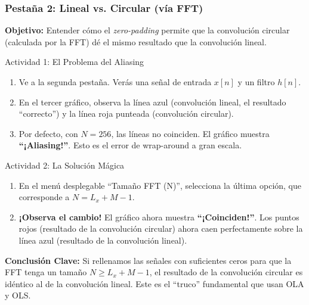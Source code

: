 \documentclass[10pt]{beamer}
\begin{document}
\begin{frame}[allowframebreaks]
  \frametitle{Pestaña 2: Lineal vs. Circular (vía FFT)}
  
  \textbf{Objetivo:} Entender cómo el \textit{zero-padding} permite que la convolución circular (calculada por la FFT) dé el mismo resultado que la convolución lineal.
  
  \begin{block}{Actividad 1: El Problema del Aliasing}
    \begin{enumerate}
      \item Ve a la segunda pestaña. Verás una señal de entrada $x[n]$ y un filtro $h[n]$.
      \item En el tercer gráfico, observa la línea azul (convolución lineal, el resultado ``correcto'') y la línea roja punteada (convolución circular).
      \item Por defecto, con $N=256$, las líneas no coinciden. El gráfico muestra \textbf{“¡Aliasing!”}. Esto es el error de wrap-around a gran escala.
    \end{enumerate}
  \end{block}
  
  \pause
  
  \begin{block}{Actividad 2: La Solución Mágica}
    \begin{enumerate}
      \item En el menú desplegable “Tamaño FFT (N)”, selecciona la última opción, que corresponde a $N = L_x + M - 1$.
      \item \textbf{¡Observa el cambio!} El gráfico ahora muestra \textbf{“¡Coinciden!”}. Los puntos rojos (resultado de la convolución circular) ahora caen perfectamente sobre la línea azul (resultado de la convolución lineal).
    \end{enumerate}
  \end{block}
  
  \pause
  
  \begin{tcolorbox}[colback=green!5!white, colframe=green!50!black]
    \textbf{Conclusión Clave:} Si rellenamos las señales con suficientes ceros para que la FFT tenga un tamaño $N \ge L_x + M - 1$, el resultado de la convolución circular es idéntico al de la convolución lineal. Este es el ``truco'' fundamental que usan OLA y OLS.
  \end{tcolorbox}
  
\end{frame}
\end{document}

